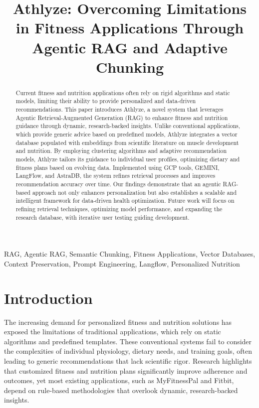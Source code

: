\documentclass[conference]{IEEEtran}
\title{Athlyze: Overcoming Limitations in Fitness Applications Through Agentic RAG and Adaptive Chunking}
\author{
    \IEEEauthorblockN{Nishchay Patel}
    \IEEEauthorblockA{
        Department of Computer Science, \\ 
        Georgia State University,\\
        Atlanta, GA, USA\\
        \href{mailto:npatel237@student.gsu.edu}{npatel237@student.gsu.edu}
    }
}
\begin{document}
\maketitle

\begin{abstract}
Current fitness and nutrition applications often rely on rigid algorithms and static models, limiting their ability to provide personalized and data-driven recommendations. This paper introduces Athlyze, a novel system that leverages Agentic Retrieval-Augmented Generation (RAG) to enhance fitness and nutrition guidance through dynamic, research-backed insights. Unlike conventional applications, which provide generic advice based on predefined models, Athlyze integrates a vector database populated with embeddings from scientific literature on muscle development and nutrition. By employing clustering algorithms and adaptive recommendation models, Athlyze tailors its guidance to individual user profiles, optimizing dietary and fitness plans based on evolving data. Implemented using GCP tools, GEMINI, LangFlow, and AstraDB, the system refines retrieval processes and improves recommendation accuracy over time. Our findings demonstrate that an agentic RAG-based approach not only enhances personalization but also establishes a scalable and intelligent framework for data-driven health optimization. Future work will focus on refining retrieval techniques, optimizing model performance, and expanding the research database, with iterative user testing guiding development.\\
\end{abstract}

\renewcommand\IEEEkeywordsname{Keywords}
\begin{IEEEkeywords}
RAG, Agentic RAG, Semantic Chunking, Fitness Applications, Vector Databases, Context Preservation, Prompt Engineering, Langflow, Personalized Nutrition
\end{IEEEkeywords}

\section{Introduction}
The increasing demand for personalized fitness and nutrition solutions has exposed the limitations of traditional applications, which rely on static algorithms and predefined templates. These conventional systems fail to consider the complexities of individual physiology, dietary needs, and training goals, often leading to generic recommendations that lack scientific rigor. Research highlights that customized fitness and nutrition plans significantly improve adherence and outcomes, yet most existing applications, such as MyFitnessPal and Fitbit, depend on rule-based methodologies that overlook dynamic, research-backed insights.
\end{document}
